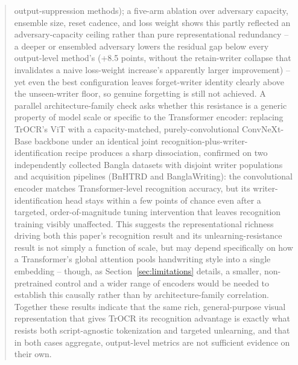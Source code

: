 \documentclass[a4paper,fleqn]{cas-dc}
\begin{document}
\begin{abstract}
output-suppression methods); a five-arm ablation over adversary capacity,
ensemble size, reset cadence, and loss weight shows this partly reflected
an adversary-capacity ceiling rather than pure representational redundancy
-- a deeper or ensembled adversary lowers the residual gap below every
output-level method's (+8.5 points, without the retain-writer collapse
that invalidates a naive loss-weight increase's apparently larger
improvement) -- yet even the best configuration leaves forget-writer
identity clearly above the unseen-writer floor, so genuine forgetting is
still not achieved. A parallel architecture-family check asks whether this
resistance is a generic property of model scale or specific to the
Transformer encoder: replacing TrOCR's ViT with a capacity-matched,
purely-convolutional ConvNeXt-Base backbone under an identical joint
recognition-plus-writer-identification recipe produces a sharp
dissociation, confirmed on two independently collected Bangla datasets
with disjoint writer populations and acquisition pipelines (BnHTRD and
BanglaWriting): the convolutional encoder matches Transformer-level
recognition accuracy, but its writer-identification head stays within a
few points of chance even after a targeted, order-of-magnitude tuning
intervention that leaves recognition training visibly unaffected. This
suggests the representational richness driving both this paper's
recognition result and its unlearning-resistance result is not simply a
function of scale, but may depend specifically on how a Transformer's
global attention pools handwriting style into a single embedding --
though, as Section~\ref{sec:limitations} details, a smaller,
non-pretrained control and a wider range of encoders would be needed to
establish this causally rather than by architecture-family correlation.
Together these results indicate that the same rich, general-purpose visual
representation that gives TrOCR its recognition advantage is exactly what
resists both script-agnostic tokenization and targeted unlearning, and that
in both cases aggregate, output-level metrics are not sufficient evidence
on their own.
\end{abstract}
\end{document}
